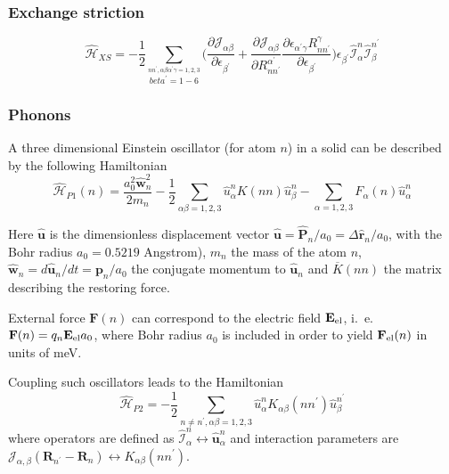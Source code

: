 \documentclass[twoside]{article}
\newcommand{\text}[1]{{\rm #1}}
\begin{document}
{\subsubsection{Exchange striction}

\begin{equation}
    \hat{\mathcal{H}}_{XS}
    =
    -
    \frac{1}{2}
    \sum_{\stackrel{nn^{\prime},\alpha\beta\alpha^{\prime}\gamma=1,2,3}{beta^{\prime}=1-6}}
    \Biggl(
        \frac{\partial \mathcal{J}_{\alpha\beta}}{\partial \epsilon_{\beta^{\prime}}}
        +
        \frac{\partial \mathcal{J}_{\alpha\beta}}{\partial R_{nn^{\prime}}^{\alpha^{\prime}}}
        \frac{\partial \epsilon_{\alpha^{\prime}\gamma} R_{nn^{\prime}}^{\gamma}}{\partial \epsilon_{\beta^{\prime}}}
    \Biggr)
    \epsilon_{\beta^{\prime}}
    \hat{\mathcal{I}}_{\alpha}^n
    \hat{\mathcal{I}}_{\beta}^{n^{\prime}}
\end{equation}


\subsubsection{Phonons}

A three dimensional Einstein oscillator (for atom $n$) in a solid can be
described by the following Hamiltonian
\begin{equation}
    \hat{\mathcal{H}}_{P1}(n)
    =
    \frac{a_0^2\hat{\mathbf{w}}_n^2}{2m_n}
    -
    \frac{1}{2}
    \sum_{\alpha\beta=1,2,3}
    \hat{u}_{\alpha}^n
    K(nn)
    \hat{u}_{\beta}^n
    -
    \sum_{\alpha=1,2,3}
    F_{\alpha}(n)
    \hat{u}_{\alpha}^n
\end{equation}

Here $\hat{\mathbf{u}}$ is the dimensionless displacement vector 
$\hat{\mathbf{u}} = \hat{\mathbf{P}}_n / a_0 = \Delta \hat{\mathbf{r}}_n / a_0$,
with the Bohr radius $a_0 = 0.5219$ Angstrom), $m_n$ the mass of the atom
$n$, $\hat{\mathbf{w}}_n = d\hat{\mathbf{u}}_n/dt = \mathbf{p}_n / a_0$
the conjugate momentum to $\hat{\mathbf{u}}_n$ and $\overline{K}(nn)$
the matrix describing the restoring force.

External force $\mathbf{F}(n)$ can correspond to the electric field
$\mathbf{E}_{\text{el}}$, i.~e. $\mathbf{F}(n) = q_n \mathbf{E}_{\text{el}} a_0$,
where Bohr radius $a_0$ is included in order to yield
$\mathbf{F}_{\text{el}}(n)$ in units of meV.

Coupling such oscillators leads to the Hamiltonian
\begin{equation}
    \hat{\mathcal{H}}_{P2}
    =
    -
    \frac{1}{2}
    \sum_{n\ne n^{\prime},\alpha\beta=1,2,3}
    \hat{u}_{\alpha}^n
    K_{\alpha\beta}(nn^{\prime})
    \hat{u}_{\beta}^{n^{\prime}}
\end{equation}
where operators are defined as $\hat{\mathcal{I}}_{\alpha}^n \leftrightarrow \hat{\mathbf{u}}^n_{\alpha}$
and interaction parameters are
$\mathcal{J}_{\alpha,\beta}(\mathbf{R}_{n^{\prime}} - \mathbf{R}_{n}) \leftrightarrow K_{\alpha\beta}(nn^{\prime})$.



}
\end{document}
